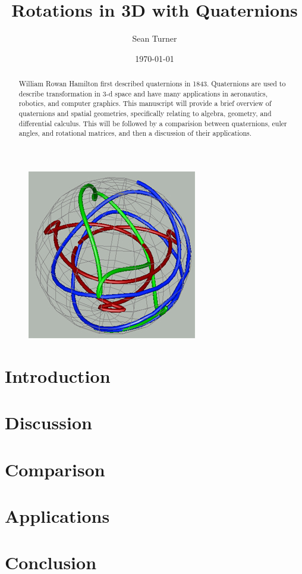 \documentclass{article}
\theoremstyle{definition}
\begin{document}
\title{Rotations in 3D with Quaternions}
\date{\today}
\author{Sean Turner}
\maketitle

\begin{figure}[H]
\centering
\includegraphics[width = .65\textwidth]{Figures/quaternion_map}
\end{figure}

\newpage
{}
\tableofcontents
\listoffigures
\newpage
{}
\begin{abstract}
\noindent William Rowan Hamilton first described quaternions in 1843.
Quaternions are used to describe transformation in 3-d space and have many applications in aeronautics, robotics, and computer graphics.
This manuscript will provide a brief overview of quaternions and spatial geometries, specifically relating to algebra, geometry, and differential calculus.
This will be followed by a comparision between quaternions, euler angles, and rotational matrices, and then a discussion of their applications.
\end{abstract}

\section{Introduction}


\section{Discussion}
\label{sec:disc}


\section{Comparison}
\label{sec:comp}


\section{Applications}
\label{sec:app}


\section{Conclusion}
\label{sec:conc}


\newpage


\end{document}
